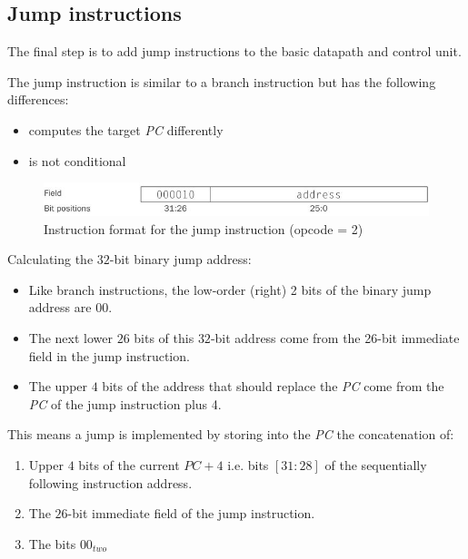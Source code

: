\documentclass[10pt,a4paper]{article}
\begin{document}
\pagebreak

\subsection{Jump instructions}

The final step is to add jump instructions to the basic datapath and control unit. 

The jump instruction is similar to a branch instruction but has the following differences:
\begin{itemize}
    \item computes the target \textit{PC} differently
    \item is not conditional
\end{itemize}  

\begin{figure} [h!]
    \centering
    \includegraphics[scale=0.8]{Jump.JPG}
    \caption{Instruction format for the jump instruction (opcode = 2)}
\end{figure}

Calculating the $32$-bit binary jump address: 
\begin{itemize}
    \item Like branch instructions, the low-order (right) 2 bits of the binary jump address are $00$.
    \item The next lower $26$ bits of this $32$-bit address come from the 26-bit immediate field in the jump
    instruction.
    \item The upper $4$ bits of the address that should replace the \textit{PC} come from the \textit{PC} of the jump instruction plus 4.
\end{itemize}
This means a jump is implemented by storing into the \textit{PC} the concatenation of:
\begin{enumerate}
    \item  Upper $4$ bits of the current $PC + 4$ i.e. bits $[31:28]$ of the sequentially following instruction address.
    \item The $26$-bit immediate field of the jump instruction.
    \item The bits $00_{two}$
\end{enumerate}
\end{document}
